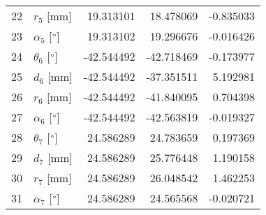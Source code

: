 \documentclass{standalone}%
\begin{document}
\begin{tabular}{llrrr}
22 &              $r_{5}$ [mm] &  19.313101 &  18.478069 &  -0.835033 \\
23 &  $\alpha_{5}$ [$\degree$] &  19.313102 &  19.296676 &  -0.016426 \\
24 &  $\theta_{6}$ [$\degree$] & -42.544492 & -42.718469 &  -0.173977 \\
25 &              $d_{6}$ [mm] & -42.544492 & -37.351511 &   5.192981 \\
26 &              $r_{6}$ [mm] & -42.544492 & -41.840095 &   0.704398 \\
27 &  $\alpha_{6}$ [$\degree$] & -42.544492 & -42.563819 &  -0.019327 \\
28 &  $\theta_{7}$ [$\degree$] &  24.586289 &  24.783659 &   0.197369 \\
29 &              $d_{7}$ [mm] &  24.586289 &  25.776448 &   1.190158 \\
30 &              $r_{7}$ [mm] &  24.586289 &  26.048542 &   1.462253 \\
31 &  $\alpha_{7}$ [$\degree$] &  24.586289 &  24.565568 &  -0.020721 \\
\bottomrule
\end{tabular}
%
\end{document}
